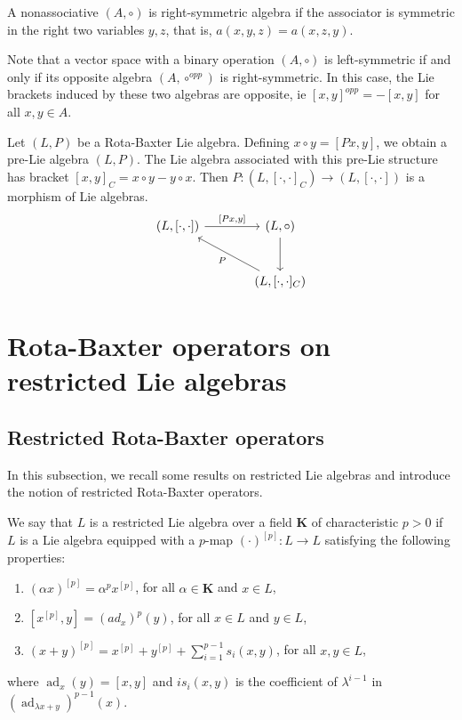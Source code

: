 \documentclass[11pt, twoside]{article}
\DeclareMathOperator{\ad}{ad}
\begin{document}
\begin{rmq}
    A nonassociative  $(A,\circ)$ is right-symmetric  algebra if  the associator is symmetric in the right two variables $y,z$,  that is,  $
        a(x,y,z)= a(x,z,y).$
   
    Note that a vector space with a binary operation $(A,\circ)$ is left-symmetric if and only if its opposite algebra $(A,\circ^{opp})$ is right-symmetric. In this case, the Lie brackets induced by these two algebras are opposite, ie $[x,y]^{opp}=-[x,y] $ for all $x,y\in A$.
\end{rmq}

Let $(L,P)$ be a Rota-Baxter Lie algebra. Defining $x\circ y= [Px,y] $, we obtain a pre-Lie algebra $(L,P)$. The Lie algebra associated with this pre-Lie structure has bracket $[x,y]_{C}=x\circ y-y\circ x $. Then $P:(L,[\cdot,\cdot]_C)\to (L,[\cdot,\cdot]) $ is a morphism of Lie algebras. 
\[\begin{tikzcd}[row sep=large, column sep=large]
	{(L,[\cdot,\cdot])} & {(L,\circ)} \\
	& {(L,[\cdot,\cdot]_C)}
	\arrow["{[Px,y]}", from=1-1, to=1-2]
	\arrow[from=1-2, to=2-2]
	\arrow["P", from=2-2, to=1-1]
\end{tikzcd}\]
 

\section{Rota-Baxter operators on restricted Lie algebras}\label{s3}

\subsection{Restricted Rota-Baxter operators}

 In this subsection, we recall some results on restricted Lie algebras and introduce the notion of restricted Rota-Baxter operators.

\begin{defi}\label{d3.1}
    We say that $L$ is a restricted Lie algebra over a field $\mathbf{K}$ of characteristic $p>0$ if $L$ is a Lie algebra equipped with a $p$-map $(\cdot)^{[p]}: L\to L$ satisfying the following properties: \begin{enumerate}
        
        \item $(\alpha x)^{[p]}= \alpha^p x^{[p]} $, for all $\alpha \in \mathbf{K}$ and $x\in L$,
        \item  $[x^{[p]},y]= (ad_x)^p(y) $, for all $x\in L$ and $y\in L $,
        \item  $(x+y)^{[p]}= x^{[p]} + y^{[p]} + \sum\limits_{i=1}^{p-1} s_i(x,y) $, for all $ x,y\in L$,
    \end{enumerate} where $\ad_x(y) = [x,y] $ and $is_i(x,y) $ is the coefficient of $\lambda^{i-1} $ in $(\ad_{\lambda x+y})^{p-1}(x) $.
\end{defi}
\end{document}
